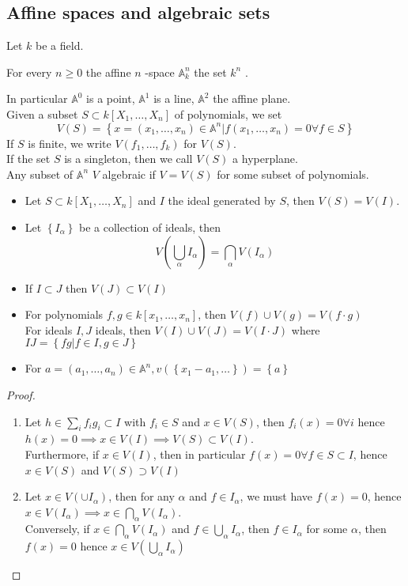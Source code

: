 \documentclass[../main.tex]{subfiles}
\begin{document}
\subsection{Affine spaces and algebraic sets}
Let $k$ be a field.
\begin{defn}
	For every $n \geq 0$ the affine $n$ -space $ \mathbb{A}_k^{n}$ the set $k^{n}$ .	
\end{defn}
In particular $ \mathbb{A}^{0}$ is a point, $ \mathbb{A}^{1}$ is a line, $ \mathbb{A}^{2}$ the affine plane.\\
Given a subset $ S \subset k [ X_1,\ldots, X_n] $ of polynomials, we set
\[ 
V( S) = \left\{ x= ( x_1, \ldots, x_n) \in \mathbb{A}^{n}| f( x_1,\ldots, x_n)=0 \forall f \in S  \right\} 
\]
If $S$ is finite, we write $V(  f_1,\ldots, f_k) $ for $V( S) $.\\
If the set $S$ is a singleton, then we call $V( S) $ a hyperplane.\\
Any subset of $ \mathbb{A}^{n}$  $V$ algebraic if $V=V( S) $ for some subset of polynomials.
\begin{lemma}
	\begin{itemize}
	\item 
	Let $S \subset k[X_1,\ldots, X_n]$ and $I$ the ideal generated by $S$, then $V( S) = V( I) $.

\item Let $ \left\{ I_\alpha \right\} $ be a collection of ideals, then 
	\[ 
	V( \bigcup_\alpha I_\alpha) = \bigcap_{\alpha} V( I_\alpha) 
	\]
	
\item If $I \subset J$ then $V( J) \subset V( I) $ 
\item For polynomials $f,g \in k[x_1,\ldots, x_n]$, then $V( f) \cup V( g) = V( f\cdot g) $ \\
For ideals $I,J$ ideals, then $V( I) \cup V( J) = V( I\cdot J) $ where $IJ = \left\{ fg | f\in I , g\in J \right\} $ 
\item For $a= ( a_1,\ldots, a_n) \in \mathbb{A}^{n}, v( \left\{ x_1-a_1,\ldots \right\} ) = \left\{ a \right\} 	$
	\end{itemize}
\end{lemma}
\begin{proof}
\begin{enumerate}
\item Let $h \in \sum_i f_i g_i \subset I $ with $f_i \in S$ and $x\in V( S) $, then $f_i( x) =0\forall i$ hence $h(x)=0 \implies x\in V( I) 	\implies V( S) \subset V( I) 	 $.\\
	Furthermore, if $x\in V( I) $, then in particular $f( x) = 0 \forall f \in S \subset I$, hence $x \in V( S) $ and $V( S) \supset V( I) $ 
\item Let $x\in V( \cup I_\alpha) $, then for any $\alpha$ and $f\in I_\alpha$, we must have $f( x) =0$, hence $x\in V( I_\alpha) \implies x\in \bigcap_{\alpha} V( I_\alpha) $.\\
	Conversely, if $x\in \bigcap_{\alpha} V( I_\alpha) $ and $f\in \bigcup_{\alpha} I_\alpha$, then $f\in I_\alpha$ for some $\alpha$, then $f( x) =0$ hence $x\in V( \bigcup_\alpha I_\alpha) $ 
\end{enumerate}

\end{proof}
\end{document}
